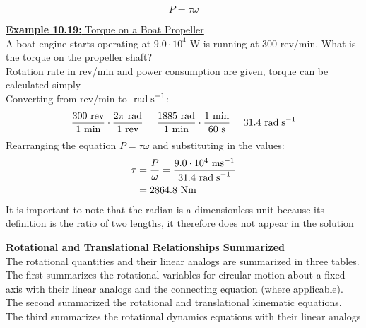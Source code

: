 \documentclass[a4paper]{article}
\let\bf\textbf
\newcommand\rads{\text{ rad\;s}^{-1}}
\newcommand\rad{\text{ rad}}
\newcommand\s{\text{ s}}
\newcommand\Nm{\text{ Nm}}
\newcommand\ms{\text{ ms}^{-1}}
\begin{document}
\begin{equation}
    P = \tau\omega
\end{equation}
\begin{shaded}
    \underline{\bf{Example 10.19:} Torque on a Boat Propeller}
    \vspace{2mm}\\
    A boat engine starts operating at $9.0\cdot10^4$ W is running at 300 rev/min. What is the torque on the propeller shaft?
    \vspace{1mm}\\
    Rotation rate in rev/min and power consumption are given, torque can be calculated simply
    \vspace{1mm}\\
    Converting from rev/min to $\rads$:
    \begin{align*}
        \frac{300\text{ rev}}{1\text{ min}}\cdot \frac{2\pi\rad}{1\text{ rev}} = \frac{1885\text{ rad}}{1\text{ min}}\cdot\frac{1\text{ min}}{60\s} = 31.4\rads
    \end{align*}
    Rearranging the equation $P = \tau\omega$ and substituting in the values:
    \begin{align*}
        \tau &= \frac{P}{\omega} = \frac{9.0\cdot10^4\ms}{31.4\rads}\\
        &= 2864.8\Nm
    \end{align*}
    It is important to note that the radian is a dimensionless unit because its definition is the ratio of two lengths, it therefore does not appear in the solution
\end{shaded}
\bf{Rotational and Translational Relationships Summarized}
\vspace{2mm}\\
The rotational quantities and their linear analogs are summarized in three tables. The first summarizes the rotational variables for circular motion about a fixed axis with their linear analogs and the connecting equation (where applicable). The second summarized the rotational and translational kinematic equations. The third summarizes the rotational dynamics equations with their linear analogs
\end{document}
